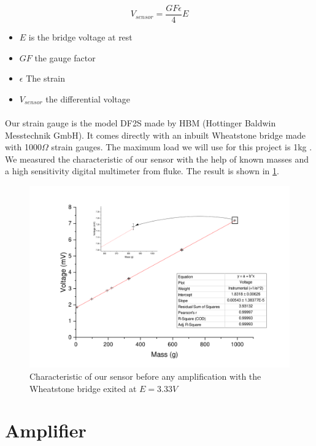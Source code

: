 \documentclass{article}[12pt]
\begin{document}
\begin{equation}
V_{sensor}=\dfrac{GF \epsilon}{4}E
\end{equation}
\begin{itemize}
\item $E$ is the bridge voltage at rest
\item $GF$ the gauge factor
\item $\epsilon$ The strain
\item $V_{sensor}$ the differential voltage
\end{itemize}
\paragraph{}
Our strain gauge is the model DF2S made by HBM (Hottinger Baldwin Messtechnik GmbH). It comes directly with an inbuilt Wheatstone bridge made with 1000$\Omega$ strain gauges. The maximum load we will use for this project is 1kg \cite{HottingerBaldwinMesstechnikGmbH}. We measured the characteristic of our sensor with the help of known masses and a high sensitivity digital multimeter from fluke. The result is shown in \ref{fig:beforeamp}.
\begin{figure}[H]
	\centering
	\includegraphics[width=\textwidth]{figures/beforeamp.pdf}
	\caption{Characteristic of our sensor before any amplification with the Wheatstone bridge exited at $E=3.33V$}
	\label{fig:beforeamp}
\end{figure}

\section{Amplifier}
\end{document}
